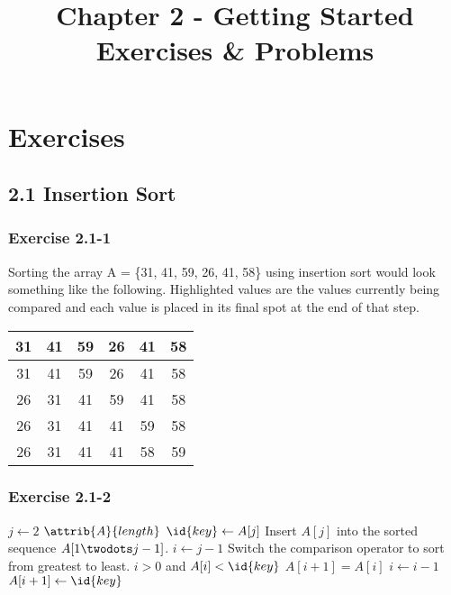 \documentclass{article}
\title{Chapter 2 - Getting Started \\
Exercises \& Problems}
\date{}
\begin{document}
\maketitle
{}

\section*{Exercises}
\subsection*{2.1 Insertion Sort}
\subsubsection*{Exercise 2.1-1}
Sorting the array A = \{31, 41, 59, 26, 41, 58\} using insertion sort would look something like the following. Highlighted values are the values currently being compared and each value is placed in its final spot at the end of that step.

\begin{center}
    \begin {tabular}{|c|c|c|c|c|c|} \hline
    31  &   \cellcolor{blue!25}41   &   59  &   26  &   41  &   58  \\ \hline
    31  &   41  &   \cellcolor{blue!25}59   &   26  &   41  &   58  \\ \hline
    \cellcolor{blue!25}26   &   31  &   41  &   59  &   41  &   58  \\ \hline
    26  &   31  &   41  &   \cellcolor{blue!25}41   &   59  &   58  \\ \hline
    26  &   31  &   41  &   41  &   \cellcolor{blue!25}58   &   59  \\ \hline
    \end{tabular}
\end{center}

\subsubsection*{Exercise 2.1-2}

\begin{codebox}
\li \For $j \gets 2$ \To  $\attrib{A}{length}$
\li \Do
        $\id{key} \gets A[j]$
\li     \Comment Insert $A[j]$ into the sorted sequence
            $A[1 \twodots j-1]$.
\li     $i \gets j - 1$
\li     \Comment Switch the comparison operator to sort
            from greatest to least.
\li     \While $i > 0$ and $A[i] < \id{key}$
\li     \Do
            $A[i + 1] = A[i]$
\li         $i \gets i - 1$
        \End
\li     $A[i+1] \gets \id{key}$
    \End
\end{codebox}
\end{document}
